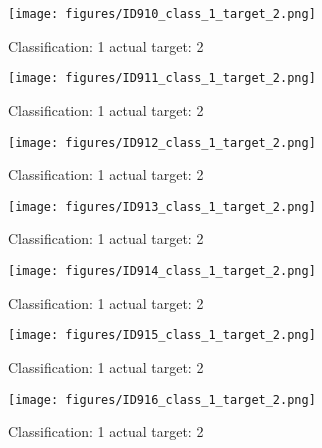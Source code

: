 \begin{figure}[h!]
\begin{center}
\texttt{[image: figures/ID910\_class\_1\_target\_2.png]}
\end{center}
\caption{ Classification: 1 actual target: 2}
\label{fig:ID910_class_1_target_2}
\end{figure}
\begin{figure}[h!]
\begin{center}
\texttt{[image: figures/ID911\_class\_1\_target\_2.png]}
\end{center}
\caption{ Classification: 1 actual target: 2}
\label{fig:ID911_class_1_target_2}
\end{figure}
\begin{figure}[h!]
\begin{center}
\texttt{[image: figures/ID912\_class\_1\_target\_2.png]}
\end{center}
\caption{ Classification: 1 actual target: 2}
\label{fig:ID912_class_1_target_2}
\end{figure}
\begin{figure}[h!]
\begin{center}
\texttt{[image: figures/ID913\_class\_1\_target\_2.png]}
\end{center}
\caption{ Classification: 1 actual target: 2}
\label{fig:ID913_class_1_target_2}
\end{figure}
\begin{figure}[h!]
\begin{center}
\texttt{[image: figures/ID914\_class\_1\_target\_2.png]}
\end{center}
\caption{ Classification: 1 actual target: 2}
\label{fig:ID914_class_1_target_2}
\end{figure}
\begin{figure}[h!]
\begin{center}
\texttt{[image: figures/ID915\_class\_1\_target\_2.png]}
\end{center}
\caption{ Classification: 1 actual target: 2}
\label{fig:ID915_class_1_target_2}
\end{figure}
\begin{figure}[h!]
\begin{center}
\texttt{[image: figures/ID916\_class\_1\_target\_2.png]}
\end{center}
\caption{ Classification: 1 actual target: 2}
\label{fig:ID916_class_1_target_2}
\end{figure}
